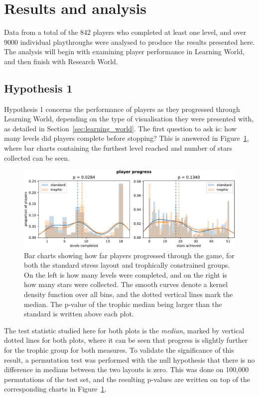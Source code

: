 \section{Results and analysis}
\label{sec:eco_results}

Data from a total of the 842 players who completed at least one level, and over 9000 individual playthroughs were analysed to produce the results presented here. The analysis will begin with examining player performance in Learning World, and then finish with Research World.

\subsection{Hypothesis 1}
\label{sec:hypothesis1}
Hypothesis 1 concerns the performance of players as they progressed through Learning World, depending on the type of visualisation they were presented with, as detailed in Section~\ref{sec:learning_world}.
The first question to ask is: how many levels did players complete before stopping? This is answered in Figure~\ref{fig:player_progression}, where bar charts containing the furthest level reached and number of stars collected can be seen.
\begin{figure}
    \centering
    \includegraphics[width=\textwidth]{joy/stars.pdf}
    \caption[Bar charts showing player progressed]{Bar charts showing how far players progressed through the game, for both the standard stress layout and trophically constrained groups. On the left is how many levels were completed, and on the right is how many stars were collected. The smooth curves denote a kernel density function over all bins, and the dotted vertical lines mark the median. The p-value of the trophic median being larger than the standard is written above each plot.}
    \label{fig:player_progression}
\end{figure}
The test statistic studied here for both plots is the \emph{median}, marked by vertical dotted lines for both plots, where it can be seen that progress is slightly further for the trophic group for both measures.
To validate the significance of this result, a permutation test was performed with the null hypothesis that there is no difference in medians between the two layouts is zero.
This was done on 100,000 permutations of the test set, and the resulting p-values are written on top of the corresponding charts in Figure~\ref{fig:player_progression}.

